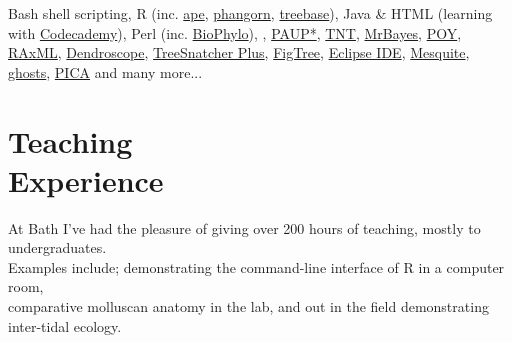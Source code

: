 \documentclass[margin,line]{resume}
\begin{document}
\begin{resume}
    Bash shell scripting, R (inc. \href{http://cran.r-project.org/web/packages/ape/}{ape}, \href{http://cran.r-project.org/web/packages/phangorn/}{phangorn}, \href{http://cran.r-project.org/web/packages/treebase/}{treebase}), Java \& HTML (learning with \href{http://www.codecademy.com/users/rmounce}{Codecademy}), Perl (inc. \href{http://search.cpan.org/dist/Bio-Phylo/}{BioPhylo}), \LaTeXe, \href{http://paup.csit.fsu.edu/}{PAUP*}, \href{http://www.zmuc.dk/public/phylogeny/tnt/}{TNT}, \href{http://mrbayes.sourceforge.net/}{MrBayes}, \href{http://research.amnh.org/scicomp/research/projects/invertebrate-zoology/poy?q=projects/poy.php}{POY}, \href{http://sco.h-its.org/exelixis/software.html}{RAxML}, \href{http://ab.inf.uni-tuebingen.de/software/dendroscope/}{Dendroscope}, \href{http://www.cs.uni-duesseldorf.de/AG/BI/Software/treesnatcher/}{TreeSnatcher Plus}, \href{http://tree.bio.ed.ac.uk/software/figtree/}{FigTree}, \href{http://www.eclipse.org/}{Eclipse IDE}, \href{http://mesquiteproject.org/mesquite/mesquite.html}{Mesquite}, \href{http://palaeo.gly.bris.ac.uk/cladestrat/Gho2.html}{ghosts}, \href{http://www.nhm.ac.uk/research-curation/research/projects/software/}{PICA} and many more...\\

\vspace{-7 mm} 
    \section{\mysidestyle Teaching \\ Experience}

At Bath I've had the pleasure of giving over 200 hours of teaching, mostly to undergraduates. \\ Examples include; demonstrating the command-line interface of R in a computer room, \\ comparative molluscan anatomy in the lab, and out in the field demonstrating inter-tidal ecology.\\

\vspace{-7 mm} 

\end{resume}
\end{document}
